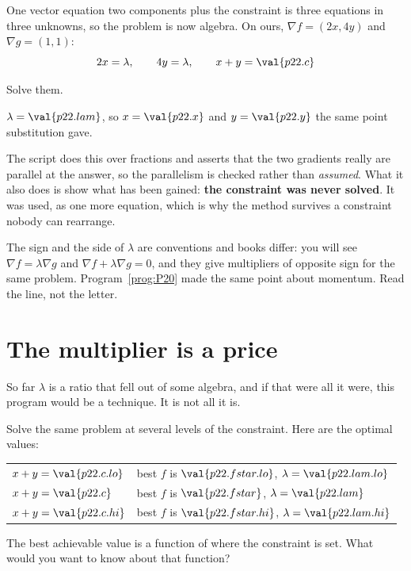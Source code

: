 \begin{fr}
One vector equation \dash{} two components \dash{} plus the constraint is three
equations in three unknowns, so the problem is now algebra. On ours,
$\nabla f = (2x, 4y)$ and
$\nabla g = (1, 1)$:
\[ 2x = \lambda, \qquad 4y = \lambda, \qquad x + y = \val{p22.c} \]

Solve them.
\nextframe
\end{fr}

\begin{fr}
\begin{ansblock}
$\lambda = \val{p22.lam}$, so $x = \val{p22.x}$ and $y = \val{p22.y}$
\dash{} the same point substitution gave.
\end{ansblock}

The script does this over fractions and asserts that the two gradients really
are parallel at the answer, so the parallelism is checked rather than
\emph{assumed}. What it also does is show what has been gained:
\textbf{the constraint was never solved}. It was used, as one more equation,
which is why the method survives a constraint nobody can rearrange.

\begin{note}
The sign and the side of $\lambda$ are conventions and books differ: you will
see $\nabla f = \lambda\nabla g$ and $\nabla f + \lambda\nabla g = 0$, and they
give multipliers of opposite sign for the same problem. Program~\ref{prog:P20}
made the same point about momentum. Read the line, not the letter.
\end{note}
\end{fr}

\section{The multiplier is a price}
\label{sec:P22-price}

\begin{fr}
So far $\lambda$ is a ratio that fell out of some algebra, and if that were all
it were, this program would be a technique. It is not all it is.

Solve the same problem at several levels of the constraint. Here are the
optimal values:

\begin{center}
\begin{tabular}{ll}
\toprule
$x + y = \val{p22.c.lo}$ & best $f$ is $\val{p22.fstar.lo}$, $\lambda = \val{p22.lam.lo}$ \\
$x + y = \val{p22.c}$ & best $f$ is $\val{p22.fstar}$, $\lambda = \val{p22.lam}$ \\
$x + y = \val{p22.c.hi}$ & best $f$ is $\val{p22.fstar.hi}$, $\lambda = \val{p22.lam.hi}$ \\
\bottomrule
\end{tabular}
\end{center}

The best achievable value is a function of where the constraint is set. What
would you want to know about that function?
\dotline
\nextframe
\end{fr}

